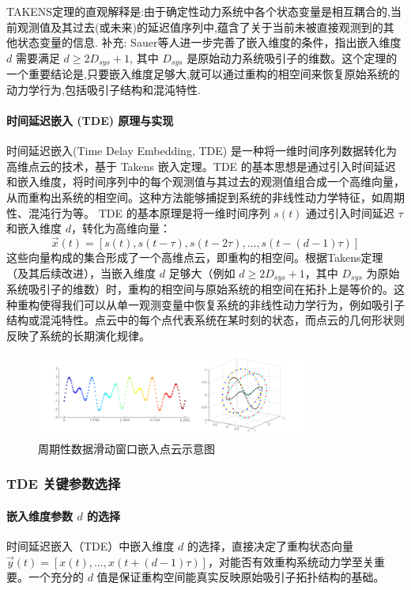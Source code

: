 TAKENS定理的直观解释是:由于确定性动力系统中各个状态变量是相互耦合的,当前观测值及其过去(或未来)的延迟值序列中,蕴含了关于当前未被直接观测到的其他状态变量的信息.
补充: Sauer等人进一步完善了嵌入维度的条件，指出嵌入维度 $d$ 需要满足 $d \geq 2D_{sys}+1$, 其中 $D_{sys}$ 是原始动力系统吸引子的维数。这个定理的一个重要结论是,只要嵌入维度足够大,就可以通过重构的相空间来恢复原始系统的动力学行为,包括吸引子结构和混沌特性.

\paragraph{时间延迟嵌入 (TDE) 原理与实现} %
时间延迟嵌入(Time Delay Embedding, TDE) 是一种将一维时间序列数据转化为高维点云的技术，基于 Takens 嵌入定理。TDE 的基本思想是通过引入时间延迟和嵌入维度，将时间序列中的每个观测值与其过去的观测值组合成一个高维向量，从而重构出系统的相空间。这种方法能够捕捉到系统的非线性动力学特征，如周期性、混沌行为等。
TDE 的基本原理是将一维时间序列 \( s(t) \) 通过引入时间延迟 \( \tau \) 和嵌入维度 \( d \)，转化为高维向量：
\begin{equation}
    \vec{x}(t) = \left[ s(t), s(t - \tau), s(t - 2\tau), \dots, s(t - (d - 1)\tau) \right]
\end{equation}
这些向量构成的集合形成了一个高维点云，即重构的相空间。根据Takens定理（及其后续改进），当嵌入维度 $d$ 足够大（例如 $d \geq 2D_{sys} + 1$，其中 $D_{sys}$ 为原始系统吸引子的维数）时，重构的相空间与原始系统的相空间在拓扑上是等价的。这种重构使得我们可以从单一观测变量中恢复系统的非线性动力学行为，例如吸引子结构或混沌特性。点云中的每个点代表系统在某时刻的状态，而点云的几何形状则反映了系统的长期演化规律。
\begin{figure}[thbp!]
    \centering
    \includegraphics[width=0.8\textwidth]{figure/滑动窗口嵌入示意图、.png}
    \caption{周期性数据滑动窗口嵌入点云示意图}
    \label{fig:tde_example}
\end{figure}

\subsubsection{TDE 关键参数选择}
\paragraph{嵌入维度参数 $d$ 的选择} %
时间延迟嵌入（TDE）中嵌入维度 $d$ 的选择，直接决定了重构状态向量 $\vec{y}(t) = [x(t), \dots, x(t+(d-1)\tau)]$，对能否有效重构系统动力学至关重要。一个充分的 $d$ 值是保证重构空间能真实反映原始吸引子拓扑结构的基础。

